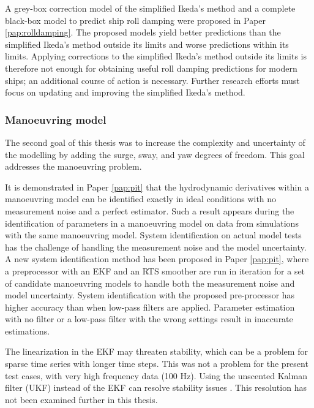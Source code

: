 A grey-box correction model of the simplified Ikeda's method and a complete black-box model to predict ship roll damping were proposed in Paper \ref{pap:rolldamping}. The proposed models yield better predictions than the simplified Ikeda's method outside its limits and worse predictions within its limits. Applying corrections to the simplified Ikeda's method outside its limits is therefore not enough for obtaining useful roll damping predictions for modern ships; an additional course of action is necessary. Further research efforts must focus on updating and improving the simplified Ikeda's method.

\subsubsection*{\normalfont \color{black} \textbf{Manoeuvring model}}
The second goal of this thesis was to increase the complexity and uncertainty of the modelling by adding the surge, sway, and yaw degrees of freedom. This goal addresses the manoeuvring problem. 

It is demonstrated in Paper \ref{pap:pit} that the hydrodynamic derivatives within a manoeuvring model can be identified exactly in ideal conditions with no measurement noise and a perfect estimator. Such a result appears during the identification of parameters in a manoeuvring model on data from simulations with the same manoeuvring model.
System identification on actual model tests has the challenge of handling the measurement noise and the model uncertainty. A new system identification method has been proposed in Paper \ref{pap:pit}, where a preprocessor with an EKF and an RTS smoother are run in iteration for a set of candidate manoeuvring models to handle both the measurement noise and model uncertainty. System identification with the proposed pre-processor has higher accuracy than when low-pass filters are applied. Parameter estimation with no filter or a low-pass filter with the wrong settings result in inaccurate estimations. 

The linearization in the EKF may threaten stability, which can be a problem for sparse time series with longer time steps. This was not a problem for the present test cases, with very high frequency data (100 Hz). 
Using the unscented Kalman filter (UKF) instead of the EKF can resolve stability issues . This resolution has not been examined further in this thesis.

